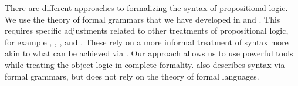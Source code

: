 There are different approaches to formalizing the syntax of propositional logic. We use the theory of formal grammars that we have developed in  and . This requires specific adjustments related to other treatments of propositional logic, for example \cite[ch. 1]{Hinman2005Logic}, \cite[def. 1.1.2]{VanDalen2004LogicAndStructure}, \cite[\S I.1]{Kleene2002Logic}, \cite[ch. 1]{КолмогоровДрагалин2006ЛогикаВведение} and \cite[\S 1.1]{ШеньВерещагин2017ЯзыкиИИсчисления}. These rely on a more informal treatment of syntax more akin to what can be achieved via . Our approach allows us to use powerful tools while treating the object logic in complete formality. \Textcite[45]{Mimram2020ProgramEqualsProof} also describes syntax via formal grammars, but does not rely on the theory of formal languages.

